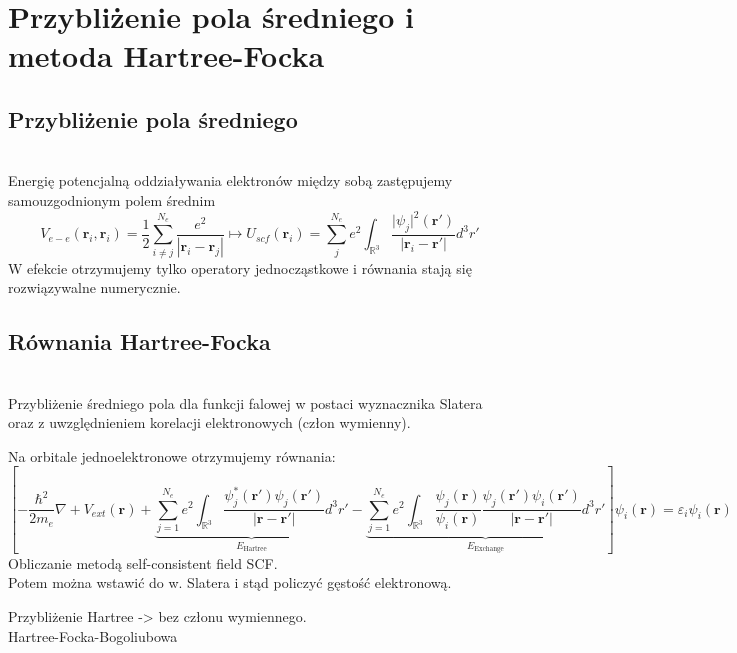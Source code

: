 \section{Przybliżenie pola średniego i metoda Hartree-Focka}


\subsection{Przybliżenie pola średniego}

~\\
Energię potencjalną oddziaływania elektronów między sobą zastępujemy samouzgodnionym polem średnim
$$ V_{e-e}\left(\boldsymbol{r}_i,\boldsymbol{r}_i\right) = \frac{1}{2}\sum_{i \neq j}^{N_{e}} \frac{ e^2}{\left\vert\boldsymbol{r}_{i}-\boldsymbol{r}_{j}\right\vert} \mapsto U_{scf}\left(\boldsymbol{r}_i\right) = \sum_{j}^{N_{e}} e^2 \int_{\mathbb{R}^3} \frac{ \vert\psi_j\vert^2\left(\boldsymbol{r}'\right) }{\left\vert\boldsymbol{r}_{i}-\boldsymbol{r}'\right\vert} d^3r' $$
W efekcie otrzymujemy tylko operatory jednocząstkowe i równania stają się rozwiązywalne numerycznie.

\subsection{Równania Hartree-Focka}
~\\
Przybliżenie średniego pola dla funkcji falowej w postaci wyznacznika Slatera oraz z uwzględnieniem korelacji elektronowych (człon wymienny).

Na orbitale jednoelektronowe otrzymujemy równania:
\begin{equation}
\left[
-\frac{\hbar^2}{2m_e} \nabla + V_{ext}\left(\boldsymbol{r}\right) +
\underset{E_\text{Hartree}}{\underbrace{
\sum_{j=1}^{N_e} e^2 \int_{\mathbb{R}^3} \frac{\psi^*_j\left(\boldsymbol{r}'\right) \psi_j\left(\boldsymbol{r}'\right)}{\vert \boldsymbol{r} - \boldsymbol{r}' \vert} d^3r'}} -
\underset{E_\text{Exchange}}{\underbrace{
\sum_{j=1}^{N_e} e^2 \int_{\mathbb{R}^3} \frac{\psi_j\left(\boldsymbol{r}\right)}{\psi_i\left(\boldsymbol{r}\right)} \frac{\psi_j\left(\boldsymbol{r}'\right) \psi_i\left(\boldsymbol{r}'\right)}{\vert \boldsymbol{r} - \boldsymbol{r}' \vert} d^3r'		
	}}
\right]
\psi_i\left(\boldsymbol{r}\right) = \varepsilon_i \psi_i \left(\boldsymbol{r}\right)
\end{equation}
Obliczanie metodą self-consistent field SCF.\\
Potem można wstawić do w. Slatera i stąd policzyć gęstość elektronową.

Przybliżenie Hartree -> bez członu wymiennego.\\
Hartree-Focka-Bogoliubowa\\